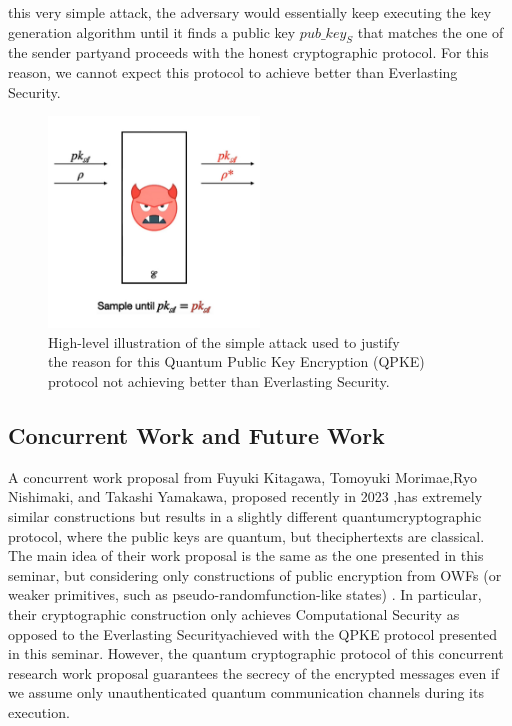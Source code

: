 \documentclass[12pt]{article}
\begin{document}
this very simple attack, the adversary would essentially keep executing the key generation algorithm until it finds a public key ${pub\_key}_{S}$ that matches the one of the sender party\break and proceeds with the honest cryptographic protocol. For this reason, we cannot expect this protocol to achieve better than Everlasting Security.

    \clearpage

    \begin{figure}[ht]
        \captionsetup{justification=centering}
        \centering
        \vspace{-12ex}
        \includegraphics[width=0.5\textwidth]{figures/images/img-4.pdf}
        \caption{High-level illustration of the simple attack used to justify\\ the reason for this Quantum Public Key Encryption (QPKE) protocol not achieving better than Everlasting Security.}
    \end{figure}
    
    
    \subsection{Concurrent Work and Future Work}
    \label{subsec:concurrent-work-and-future-work}

    A concurrent work proposal from Fuyuki Kitagawa, Tomoyuki Morimae,\break Ryo Nishimaki, and Takashi Yamakawa, proposed recently in 2023 \cite{kitagawa-morimae-nishimaki-yamakawa:quantum-public-key-encryption-tamper-resilient-public-keys-one-way-functions:2023:03-2024},\break has extremely similar constructions but results in a slightly different quantum\break cryptographic protocol, where the public keys are quantum, but the\break ciphertexts are classical. The main idea of their work proposal is the same as the one presented in this seminar, but considering only constructions of public encryption from OWFs (or weaker primitives, such as pseudo-random\break function-like states) \cite{ji-liu-song:pseudorandom-quantum-states:2018:03-2024,ananth-qian-yuen:cryptography-pseudorandom-quantum-states:2022-03-2024}. In particular, their cryptographic construction only achieves Computational Security as opposed to the Everlasting Security\break achieved with the QPKE protocol presented in this seminar. However, the quantum cryptographic protocol of this concurrent research work proposal guarantees the secrecy of the encrypted messages even if we assume only unauthenticated quantum communication channels during its execution.
\end{document}
